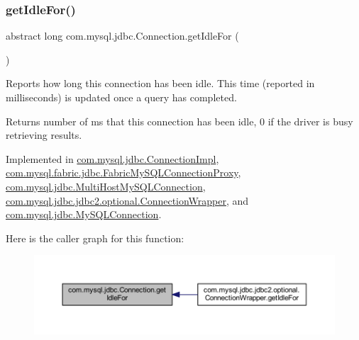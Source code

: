 \subsubsection{\texorpdfstring{get\+Idle\+For()}{getIdleFor()}}
{\footnotesize\ttfamily abstract long com.\+mysql.\+jdbc.\+Connection.\+get\+Idle\+For (\begin{DoxyParamCaption}{ }\end{DoxyParamCaption})\hspace{0.3cm}{\ttfamily [abstract]}}

Reports how long this connection has been idle. This time (reported in milliseconds) is updated once a query has completed.

\begin{DoxyReturn}{Returns}
number of ms that this connection has been idle, 0 if the driver is busy retrieving results. 
\end{DoxyReturn}


Implemented in \mbox{\hyperlink{classcom_1_1mysql_1_1jdbc_1_1_connection_impl_a6d675106c9edd73d2472401cf33b82a8}{com.\+mysql.\+jdbc.\+Connection\+Impl}}, \mbox{\hyperlink{classcom_1_1mysql_1_1fabric_1_1jdbc_1_1_fabric_my_s_q_l_connection_proxy_a6e1ff3ab80b2c51f16f27c02ae9e25a8}{com.\+mysql.\+fabric.\+jdbc.\+Fabric\+My\+S\+Q\+L\+Connection\+Proxy}}, \mbox{\hyperlink{classcom_1_1mysql_1_1jdbc_1_1_multi_host_my_s_q_l_connection_a599b45b496d131fc0a7e56c867bbb3b0}{com.\+mysql.\+jdbc.\+Multi\+Host\+My\+S\+Q\+L\+Connection}}, \mbox{\hyperlink{classcom_1_1mysql_1_1jdbc_1_1jdbc2_1_1optional_1_1_connection_wrapper_a5fe7514c30944bba398ec0412e78bd90}{com.\+mysql.\+jdbc.\+jdbc2.\+optional.\+Connection\+Wrapper}}, and \mbox{\hyperlink{interfacecom_1_1mysql_1_1jdbc_1_1_my_s_q_l_connection_a835df16f7b2e35f0729ba560fd210a2a}{com.\+mysql.\+jdbc.\+My\+S\+Q\+L\+Connection}}.

Here is the caller graph for this function\+:\nopagebreak
\begin{figure}[H]
\begin{center}
\leavevmode
\includegraphics[width=350pt]{interfacecom_1_1mysql_1_1jdbc_1_1_connection_ae3e5825f1ce28db5688c14a0ddbd95f9_icgraph}
\end{center}
\end{figure}
\mbox{\label{interfacecom_1_1mysql_1_1jdbc_1_1_connection_a1cca3272f995742c608a1646e1433704}} 
